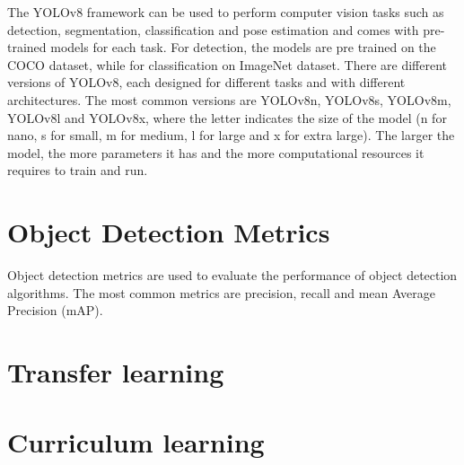 The YOLOv8 framework can be used to perform computer vision tasks such as detection, segmentation, classification and pose estimation and comes with pre-trained models for each task. For detection, the models are pre trained on the COCO dataset, while for classification on ImageNet dataset. 
There are different versions of YOLOv8, each designed for different tasks and with different architectures. The most common versions are YOLOv8n, YOLOv8s, YOLOv8m, YOLOv8l and YOLOv8x, where the letter indicates the size of the model (n for nano, s for small, m for medium, l for large and x for extra large). The larger the model, the more parameters it has and the more computational resources it requires to train and run.

\section{Object Detection Metrics}
Object detection metrics are used to evaluate the performance of object detection algorithms. The most common metrics are precision, recall and mean Average Precision (mAP).


\section{Transfer learning}

\section{Curriculum learning}
